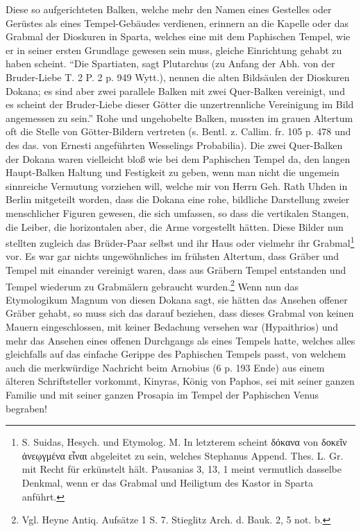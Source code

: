 \documentclass[a4paper, 11pt, oneside, polutonikogreek, german]{article}
\begin{document}
Diese so aufgerichteten Balken, welche mehr den Namen eines Gestelles oder Gerüstes als eines Tempel-Gebäudes verdienen, erinnern an die Kapelle oder das Grabmal der Dioskuren in Sparta, welches eine mit dem Paphischen Tempel, wie er in seiner ersten Grundlage gewesen sein muss, gleiche Einrichtung gehabt zu haben scheint. "`Die Spartiaten, sagt Plutarchus (zu Anfang der Abh. von der Bruder-Liebe T. 2 P. 2 p. 949 Wytt.), nennen die alten Bildsäulen der Dioskuren Dokana; es sind aber zwei parallele Balken mit zwei Quer-Balken vereinigt, und es scheint der Bruder-Liebe dieser Götter die unzertrennliche Vereinigung im Bild angemessen zu sein."' Rohe und ungehobelte Balken, mussten im grauen Altertum oft die Stelle von Götter-Bildern vertreten (s. Bentl. z. Callim. fr. 105 p. 478 und des das. von Ernesti angeführten Wesselings Probabilia). Die zwei Quer-Balken der Dokana waren vielleicht bloß wie bei dem Paphischen Tempel da, den langen Haupt-Balken Haltung und Festigkeit zu geben, wenn man nicht die ungemein sinnreiche Vermutung vorziehen will, welche mir von Herrn Geh. Rath Uhden in Berlin mitgeteilt worden, dass die Dokana eine rohe, bildliche Darstellung zweier menschlicher Figuren gewesen, die sich umfassen, so dass die vertikalen Stangen, die Leiber, die horizontalen aber, die Arme vorgestellt hätten. Diese Bilder nun stellten zugleich das Brüder-Paar selbst und ihr Haus oder vielmehr ihr Grabmal\footnote{S. Suidas, Hesych. und Etymolog. M. In letzterem scheint δόκανα von δοκεῖν ἀνεῳγμένα εἶναι abgeleitet zu sein, welches Stephanus Append. Thes. L. Gr. mit Recht für erkünstelt hält. Pausanias 3, 13, 1 meint vermutlich dasselbe Denkmal, wenn er das Grabmal und Heiligtum des Kastor in Sparta anführt.} vor. Es war gar nichts ungewöhnliches im frühsten Altertum, dass Gräber und Tempel mit einander vereinigt waren, dass aus Gräbern Tempel entstanden und Tempel wiederum zu Grabmälern gebraucht wurden.\footnote{Vgl. Heyne Antiq. Aufsätze 1 S. 7. Stieglitz Arch. d. Bauk. 2, 5 not. b.} Wenn nun das Etymologikum Magnum von diesen Dokana sagt, sie hätten das Ansehen offener Gräber gehabt, so muss sich das darauf beziehen, dass dieses Grabmal von keinen Mauern eingeschlossen, mit keiner Bedachung versehen war (Hypaithrios) und mehr das Ansehen eines offenen Durchgangs als eines Tempels hatte, welches alles gleichfalls auf das einfache Gerippe des Paphischen Tempels passt, von welchem auch die merkwürdige Nachricht beim Arnobius (6 p. 193 Ende) aus einem älteren Schriftsteller vorkommt, Kinyras, König von Paphos, sei mit seiner ganzen Familie und mit seiner ganzen Prosapia im Tempel der Paphischen Venus begraben!
\end{document}

